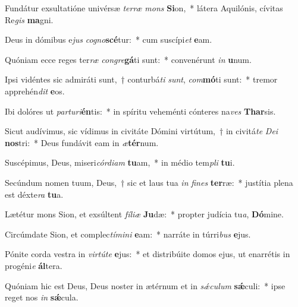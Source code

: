 \item Fundátur exsultatióne univérsæ \textit{ter}\textit{ræ} \textit{mons} \textbf{Si}on,~* látera Aquilónis, cívitas Re\textit{gis} \textbf{ma}gni.
\item Deus in dómibus e\textit{jus} \textit{co}\textit{gno}\textbf{scé}tur:~* cum suscípi\textit{et} \textbf{e}am.
\item Quóniam ecce reges ter\textit{ræ} \textit{con}\textit{gre}\textbf{gá}ti sunt:~* convenérunt \textit{in} \textbf{u}num.
\item Ipsi vidéntes sic admiráti sunt,~† conturbá\textit{ti} \textit{sunt}, \textit{com}\textbf{mó}ti sunt:~* tremor apprehén\textit{dit} \textbf{e}os.
\item Ibi dolóres ut \textit{par}\textit{tu}\textit{ri}\textbf{én}tis:~* in spíritu veheménti cónteres na\textit{ves} \textbf{Thar}sis.
\item Sicut audívimus, sic vídimus in civitáte Dómini virtútum,~† in civitá\textit{te} \textit{De}\textit{i} \textbf{nos}tri:~* Deus fundávit eam in \textit{æ}\textbf{tér}num.
\item Suscépimus, Deus, miseri\textit{cór}\textit{di}\textit{am} \textbf{tu}am,~* in médio tem\textit{pli} \textbf{tu}i.
\item Secúndum nomen tuum, Deus,~† sic et laus tua \textit{in} \textit{fi}\textit{nes} \textbf{ter}ræ:~* justítia plena est déxte\textit{ra} \textbf{tu}a.
\item Lætétur mons Sion, et exsúltent \textit{fí}\textit{li}\textit{æ} \textbf{Ju}dæ:~* propter judícia tu\textit{a}, \textbf{Dó}mine.
\item Circúmdate Sion, et complec\textit{tí}\textit{mi}\textit{ni} \textbf{e}am:~* narráte in túrri\textit{bus} \textbf{e}jus.
\item Pónite corda vestra in \textit{vir}\textit{tú}\textit{te} \textbf{e}jus:~* et distribúite domos ejus, ut enarrétis in progéni\textit{e} \textbf{ál}tera.
\item Quóniam hic est Deus, Deus noster in ætérnum et in \textit{sǽ}\textit{cu}\textit{lum} \textbf{sǽ}culi:~* ipse reget nos \textit{in} \textbf{sǽ}cula.
